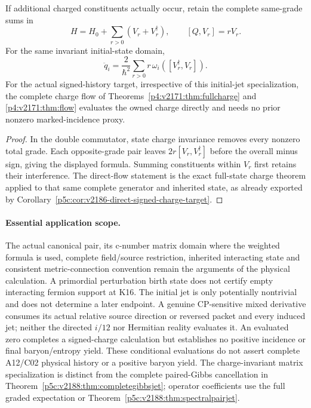 \documentclass[12pt,a4paper]{article}
\begin{document}
\begin{corollary}
\label{p5c:cor:next187-complete-graded-charge-evaluation}
If additional charged constituents actually occur, retain the complete
same-grade sums in
\[
 H=H_0+\sum_{r>0}(V_r+V_r^\dagger),\qquad [Q,V_r]=rV_r.
\]
For the same invariant initial-state domain,
\begin{equation}
 \boxed{\ddot q_i=\frac2{\hbar^2}
             \sum_{r>0}r\,\omega_i([V_r^\dagger,V_r]).}
 \label{p5c:eq:next187-complete-graded-charge-jet}
\end{equation}
For the actual signed-history target, irrespective of this initial-jet
specialization, the complete charge flow of
Theorems~\ref{p4:v2171:thm:fullcharge} and
\ref{p4:v2171:thm:flow} evaluates the owned charge directly and needs no
prior nonzero marked-incidence proxy.
\end{corollary}
\begin{proof}
In the double commutator, state charge invariance removes every nonzero
total grade. Each opposite-grade pair leaves
$2r[V_r,V_r^\dagger]$ before the overall minus sign, giving the displayed
formula. Summing constituents within $V_r$ first retains their interference.
The direct-flow statement is the exact full-state charge theorem applied
to that same complete generator and inherited state, as already exported
by Corollary~\ref{p5c:cor:v2186-direct-signed-charge-target}.
\end{proof}

\paragraph{Essential application scope.}
The actual canonical pair, its c-number matrix domain where the weighted
formula is used, complete field/source restriction, inherited
interacting state and consistent metric-connection convention remain the
arguments of the physical calculation. A primordial perturbation birth
state does not certify empty interacting fermion support at K16. The
initial jet is only potentially nontrivial and does not determine a later
endpoint. A genuine CP-sensitive mixed derivative consumes its actual
relative source direction or reversed packet and every induced jet;
neither the directed $i/12$ nor Hermitian reality evaluates it. An evaluated
zero completes a signed-charge calculation but establishes no positive
incidence or final baryon/entropy yield. These conditional evaluations do not assert complete A12/C02 physical
history or a positive baryon yield. The charge-invariant matrix specialization
is distinct from the complete paired-Gibbs cancellation in
Theorem~\ref{p5c:v2188:thm:completegibbsjet}; operator coefficients use the
full graded expectation or Theorem~\ref{p5c:v2188:thm:spectralpairjet}.
\end{document}
